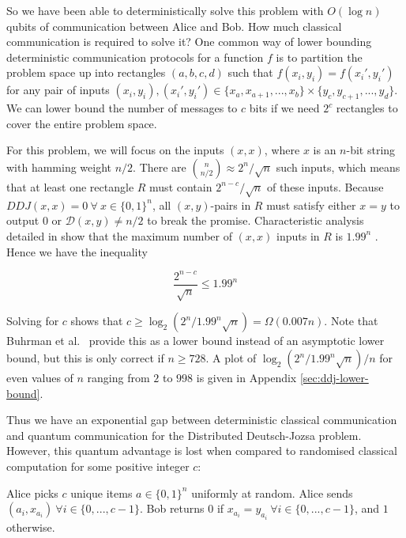 \documentclass[a4paper]{article}
\begin{document}
        So we have been able to deterministically solve this problem with $O(\log n)$ qubits of communication between Alice and Bob. How much classical communication is required to solve it? One common way of lower bounding deterministic communication protocols for a function $f$ is to partition the problem space up into rectangles $(a, b, c, d)$ such that $f(x_i, y_i) = f(x_i', y_i')$ for any pair of inputs $(x_i, y_i), (x_i', y_i') \in \{x_a,x_{a + 1},...,x_{b}\} \times \{y_c, y_{c+1},...,y_d\}$. We can lower bound the number of messages to $c$ bits if we need $2^c$ rectangles to cover the entire problem space.

        For this problem, we will focus on the inputs $(x, x)$, where $x$ is an $n$-bit string with hamming weight $n/2$. There are $\binom{n}{n/2} \approx 2^n/\sqrt{n}$ such inputs, which means that at least one rectangle $R$ must contain $2^{n-c}/\sqrt{n}$ of these inputs. Because $DDJ(x, x) = 0 ~\forall~x\in \{0, 1\}^n$, all $(x, y)$-pairs in $R$ must satisfy either $x = y$ to output $0$ or $\mathcal{D}(x, y) \neq n/2$ to break the promise. Characteristic analysis detailed in \cite{RevModPhys.82.665} show that the maximum number of $(x, x)$ inputs in $R$ is $1.99^n$ \cite{frankl1987forbidden}. Hence we have the inequality

        $$\frac{2^{n-c}}{\sqrt{n}} \leq 1.99^n$$

        Solving for $c$ shows that $c \geq \log_2(2^n/1.99^n\sqrt{n}) = \Omega(0.007n)$. Note that Buhrman et al.~\cite{RevModPhys.82.665} provide this as a lower bound instead of an asymptotic lower bound, but this is only correct if $n \geq 728$. A plot of $\log_2(2^n/1.99^n\sqrt{n})/n$ for even values of $n$ ranging from $2$ to $998$ is given in Appendix \ref{sec:ddj-lower-bound}.

        Thus we have an exponential gap between deterministic classical communication and quantum communication for the Distributed Deutsch-Jozsa problem. However, this quantum advantage is lost when compared to randomised classical computation for some positive integer $c$:

        \begin{codebox}
            \li Alice picks $c$ unique items $a \in \{0, 1\}^n$ uniformly at random.
            \li Alice sends $(a_i, x_{a_i})~ \forall i \in \{0,...,c-1\}$.
            \li Bob returns $0$ if $x_{a_i} = y_{a_i}~ \forall i \in \{0,...,c-1\}$, and $1$ otherwise.
            \End
        \end{codebox}
\end{document}
